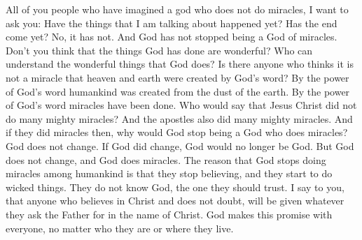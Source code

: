 All of you people who have imagined a god who does not do miracles, I want to ask you: Have the things that I am talking about happened yet? Has the end come yet? No, it has not. And God has not stopped being a God of miracles.
\bverse \iffalse Behold, are not the things that God hath wrought marvelous in our eyes? Yea, and who can comprehend the marvelous works of God? \fi
Don't you think that the things God has done are wonderful? Who can understand the wonderful things that God does?
\bverse \iffalse Who shall say that it was not a miracle that by his word the heaven and the earth should be; and by the power of his word man was created of the dust of the earth; and by the power of his word have miracles been wrought? \fi
Is there anyone who thinks it is not a miracle that heaven and earth were created by God's word? By the power of God's word humankind was created from the dust of the earth. By the power of God's word miracles have been done.
\bverse \iffalse And who shall say that Jesus Christ did not many mighty miracles? And there were many mighty miracles wrought by the hands of the apostles. \fi
Who would say that Jesus Christ did not do many mighty miracles? And the apostles also did many mighty miracles.
\bverse \iffalse And if there were miracles wrought then, why has God ceased to be a God of miracles and yet be an unchangeable Being?  And behold, I say unto you he changeth not; if so he would cease to be God; and he ceaseth not to be God, and is a God of miracles. \fi
And if they did miracles then, why would God stop being a God who does miracles? God does not change. If God did change, God would no longer be God. But God does not change, and God does miracles. 
\bverse \iffalse And the reason why he ceaseth to do miracles among the children of men is because that they dwindle in unbelief, and depart from the right way, and know not the God in whom they should trust. \fi
The reason that God stops doing miracles among humankind is that they stop believing, and they start to do wicked things. They do not know God, the one they should trust.
\bverse \iffalse Behold, I say unto you that whoso believeth in Christ, doubting nothing, whatsoever he shall ask the Father in the name of Christ it shall be granted him; and this promise is unto all, even unto the ends of the earth. \fi
I say to you, that anyone who believes in Christ and does not doubt, will be given whatever they ask the Father for in the name of Christ. God makes this promise with everyone, no matter who they are or where they live.
